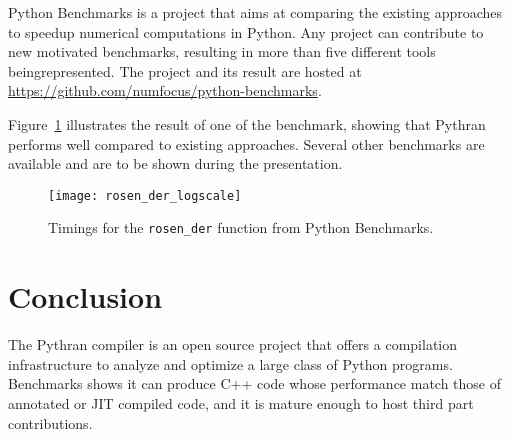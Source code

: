 \documentclass{llncs}
\begin{document}
Python Benchmarks is a project that aims at comparing the existing approaches
to speedup numerical computations in Python. Any project can contribute to new
motivated benchmarks, resulting in more than five different tools
beingrepresented. The project and its result are hosted at
\url{https://github.com/numfocus/python-benchmarks}.

Figure~\ref{fig:python-benchmarks} illustrates the result of one of the
benchmark, showing that Pythran performs well compared to existing approaches.
Several other benchmarks are available and are to be shown during the
presentation.

\begin{figure}[ht]
    \vspace{-2em}
    \hspace{-.05\textwidth}
    \texttt{[image: rosen\_der\_logscale]}
    \caption{Timings for the \texttt{rosen\_der} function from Python Benchmarks.}
    \label{fig:python-benchmarks}
    \vspace{-2em}

\end{figure}


\section{Conclusion}

The Pythran compiler is an open source project that offers a compilation
infrastructure to analyze and optimize a large class of Python programs.
Benchmarks shows it can produce C++ code whose performance match those of
annotated or JIT compiled code, and it is mature enough to host third part
contributions.
\end{document}
